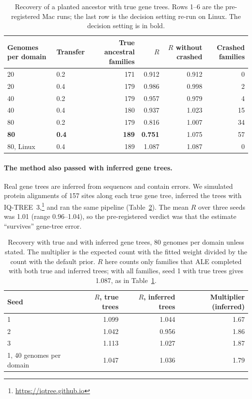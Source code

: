 \documentclass[11pt]{article}
\begin{document}
\begin{table}[ht]
\centering
\caption{Recovery of a planted ancestor with true gene trees. Rows 1--6 are the pre-registered Mac runs; the last row is the decision setting re-run on Linux. The decision setting is in bold.}
\label{tab:k2}
\small
\begin{tabular}{llrrrr}
\toprule
Genomes per domain & Transfer & True ancestral families & $R$ & $R$ without crashed & Crashed families \\
\midrule
20 & 0.2 & 171 & 0.912 & 0.912 & 0 \\
20 & 0.4 & 179 & 0.986 & 0.998 & 2 \\
40 & 0.2 & 179 & 0.957 & 0.979 & 4 \\
40 & 0.4 & 180 & 0.937 & 1.023 & 15 \\
80 & 0.2 & 179 & 0.816 & 1.007 & 34 \\
\textbf{80} & \textbf{0.4} & \textbf{189} & \textbf{0.751} & 1.075 & 57 \\
80, Linux & 0.4 & 189 & 1.087 & 1.087 & 0 \\
\bottomrule
\end{tabular}
\end{table}

\paragraph{The method also passed with inferred gene trees.} Real gene trees are inferred from sequences and contain errors. We simulated protein alignments of 157 sites along each true gene tree, inferred the trees with IQ-TREE~3,\footnote{\url{https://iqtree.github.io}} and ran the same pipeline (Table~\ref{tab:k3}). The mean $R$ over three seeds was 1.01 (range 0.96--1.04), so the pre-registered verdict was that the estimate ``survives'' gene-tree error.

\begin{table}[ht]
\centering
\caption{Recovery with true and with inferred gene trees, 80 genomes per domain unless stated. The multiplier is the expected count with the fitted weight divided by the count with the default prior. $R$ here counts only families that ALE completed with both true and inferred trees; with all families, seed 1 with true trees gives 1.087, as in Table~\ref{tab:k2}.}
\label{tab:k3}
\begin{tabular}{lrrr}
\toprule
Seed & $R$, true trees & $R$, inferred trees & Multiplier (inferred) \\
\midrule
1 & 1.099 & 1.044 & 1.67 \\
2 & 1.042 & 0.956 & 1.86 \\
3 & 1.113 & 1.027 & 1.87 \\
1, 40 genomes per domain & 1.047 & 1.036 & 1.79 \\
\bottomrule
\end{tabular}
\end{table}
\end{document}
